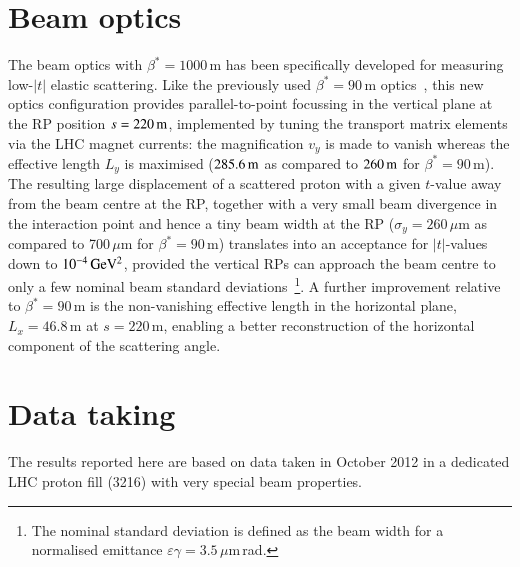 \section{Beam optics}
\label{sec:beam optics}

The beam optics with $\beta^{*} = 1000\,$m
has been specifically developed for measuring low-$|t|$ elastic scattering.
Like the previously used $\beta^{*} = 90\,$m optics~\cite{epl96,epl101-el,epl101-tot,prl111},
this new optics configuration
provides parallel-to-point focussing in the vertical plane at the RP position 
$s = 220\,{\rm m}$, implemented by tuning the transport matrix elements via the
LHC magnet currents: the magnification $v_{y}$ is made to vanish whereas the 
effective length $L_{y}$ is maximised ($285.6\,{\rm m}$ as compared to $260\,{\rm m}$ for 
$\beta^{*} = 90\,$m).
The resulting large displacement of a scattered proton with a given $t$-value 
away from the beam centre at the RP, together with a very small beam 
divergence in the interaction point and hence a tiny beam width 
at the RP ($\sigma_{y} = 260\,\mu$m as compared to 700\,$\mu$m for 
$\beta^{*} = 90\,$m) translates into 
an acceptance for $|t|$-values down to $10^{-4}\,\rm GeV^{2}$, provided the 
vertical RPs can approach the beam centre to only a few nominal beam standard 
deviations~\footnote{The nominal standard deviation is defined as 
the beam width for a normalised emittance 
$\varepsilon \gamma = 3.5\,\mu$m\,rad.}.
A further improvement relative to $\beta^{*} = 90\,$m is the non-vanishing 
effective length in the horizontal plane, $L_{x} = 46.8\,$m at $s = 220\,$m, 
enabling a better reconstruction of the horizontal component of the 
scattering angle.



\section{Data taking}
\label{sec:datataking}
%
The results reported here are based on data taken in October 2012 
in a dedicated LHC proton fill (3216)
with very special beam properties. 

